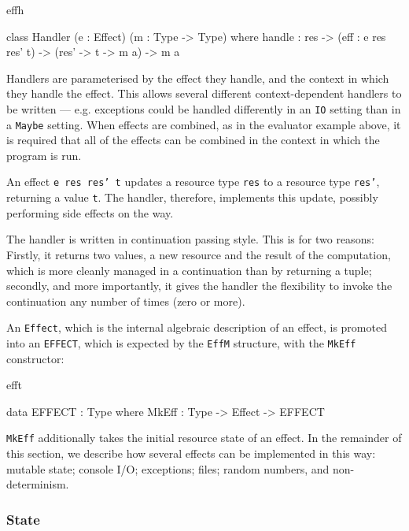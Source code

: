 \begin{SaveVerbatim}{effh}

class Handler (e : Effect) (m : Type -> Type) where
     handle : res -> (eff : e res res' t) -> 
              (res' -> t -> m a) -> m a

\end{SaveVerbatim}

\noindent
Handlers are parameterised by the effect they handle, and the context in which
they handle the effect. This allows several different context-dependent
handlers to be written --- e.g. exceptions could be handled differently in an
\texttt{IO} setting than in a \texttt{Maybe} setting. When effects are combined,
as in the evaluator example above, it is required that all of the effects
can be combined in the context in which the program is run.

An effect \texttt{e res res' t} updates a resource type \texttt{res} to a
resource type \texttt{res'}, returning a value \texttt{t}. The handler, therefore,
implements this update, possibly performing side effects on the way.

The handler is written in continuation passing style. This is for two reasons:
Firstly, it returns two values, a new resource and the result of the computation,
which is more cleanly managed in a continuation than by returning a tuple;
secondly, and more importantly, it gives the handler the flexibility to invoke
the continuation any number of times (zero or more).

An \texttt{Effect}, which is the internal algebraic description of an effect,
is promoted into an \texttt{EFFECT}, which is expected by the \texttt{EffM}
structure, with the \texttt{MkEff} constructor:

\begin{SaveVerbatim}{efft}

data EFFECT : Type where
     MkEff : Type -> Effect -> EFFECT

\end{SaveVerbatim}

\noindent
\texttt{MkEff} additionally takes the initial resource state of an effect.
In the remainder of this section, we describe how several effects can be
implemented in this way: mutable state; console I/O; exceptions; files; random
numbers, and non-determinism.

\subsubsection{State}

